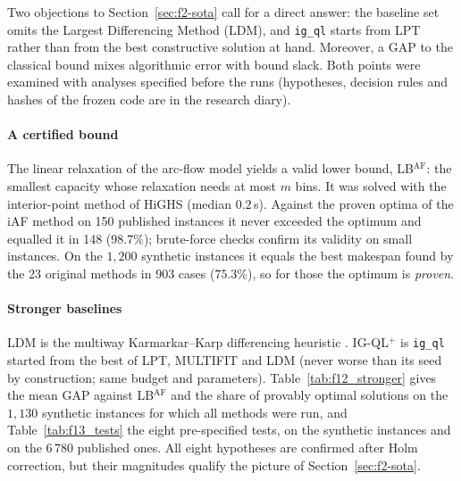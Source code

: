 \documentclass[final,3p,times,11pt,authoryear]{elsarticle}
\begin{document}
Two objections to Section~\ref{sec:f2-sota} call for a direct answer: the
baseline set omits the Largest Differencing Method (LDM), and
\texttt{ig\_ql} starts from LPT rather than from the best constructive
solution at hand. Moreover, a GAP to the classical bound mixes
algorithmic error with bound slack. Both points were examined with
analyses specified before the runs (hypotheses, decision rules and
hashes of the frozen code are in the research diary).

\paragraph{A certified bound}
The linear relaxation of the arc-flow model
\citep{MradSouayah2018,GharbiBamatraf2022} yields a valid lower bound,
LB$^{\mathrm{AF}}$: the smallest capacity whose relaxation needs at most
$m$ bins. It was solved with the interior-point method of HiGHS (median
$0.2$\,s). Against the proven optima of the iAF method
\citep{OstojicEtAl2025} on 150 published instances it never exceeded the
optimum and equalled it in 148 ($98.7\%$); brute-force checks confirm
its validity on small instances. On the $1{,}200$ synthetic instances it
equals the best makespan found by the 23 original methods in $903$ cases
($75.3\%$), so for those the optimum is \emph{proven}.

\paragraph{Stronger baselines}
LDM is the multiway Karmarkar--Karp differencing heuristic
\citep{KarmarkarKarp1983,MichielsEtal2007}. \textsc{IG-QL}$^{+}$ is
\texttt{ig\_ql} started from the best of LPT, MULTIFIT and LDM (never
worse than its seed by construction; same budget and parameters).
Table~\ref{tab:f12_stronger} gives the mean GAP against
LB$^{\mathrm{AF}}$ and the share of provably optimal solutions on the
$1{,}130$ synthetic instances for which all methods were run, and
Table~\ref{tab:f13_tests} the eight pre-specified tests, on the
synthetic instances and on the 6\,780 published ones. All eight
hypotheses are confirmed after Holm correction, but their magnitudes
qualify the picture of Section~\ref{sec:f2-sota}.



\end{document}
